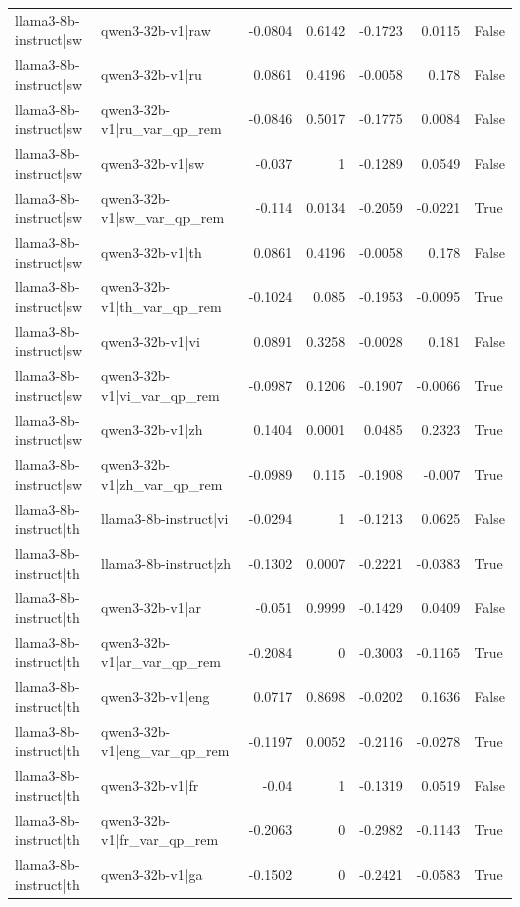 \begin{table}
\begin{tabular}{l l r r r r l}
llama3-8b-instruct|sw & qwen3-32b-v1|raw & -0.0804 & 0.6142 & -0.1723 & 0.0115 & False \\
llama3-8b-instruct|sw & qwen3-32b-v1|ru & 0.0861 & 0.4196 & -0.0058 & 0.178 & False \\
llama3-8b-instruct|sw & qwen3-32b-v1|ru_var_qp_rem & -0.0846 & 0.5017 & -0.1775 & 0.0084 & False \\
llama3-8b-instruct|sw & qwen3-32b-v1|sw & -0.037 & 1 & -0.1289 & 0.0549 & False \\
llama3-8b-instruct|sw & qwen3-32b-v1|sw_var_qp_rem & -0.114 & 0.0134 & -0.2059 & -0.0221 & True \\
llama3-8b-instruct|sw & qwen3-32b-v1|th & 0.0861 & 0.4196 & -0.0058 & 0.178 & False \\
llama3-8b-instruct|sw & qwen3-32b-v1|th_var_qp_rem & -0.1024 & 0.085 & -0.1953 & -0.0095 & True \\
llama3-8b-instruct|sw & qwen3-32b-v1|vi & 0.0891 & 0.3258 & -0.0028 & 0.181 & False \\
llama3-8b-instruct|sw & qwen3-32b-v1|vi_var_qp_rem & -0.0987 & 0.1206 & -0.1907 & -0.0066 & True \\
llama3-8b-instruct|sw & qwen3-32b-v1|zh & 0.1404 & 0.0001 & 0.0485 & 0.2323 & True \\
llama3-8b-instruct|sw & qwen3-32b-v1|zh_var_qp_rem & -0.0989 & 0.115 & -0.1908 & -0.007 & True \\
llama3-8b-instruct|th & llama3-8b-instruct|vi & -0.0294 & 1 & -0.1213 & 0.0625 & False \\
llama3-8b-instruct|th & llama3-8b-instruct|zh & -0.1302 & 0.0007 & -0.2221 & -0.0383 & True \\
llama3-8b-instruct|th & qwen3-32b-v1|ar & -0.051 & 0.9999 & -0.1429 & 0.0409 & False \\
llama3-8b-instruct|th & qwen3-32b-v1|ar_var_qp_rem & -0.2084 & 0 & -0.3003 & -0.1165 & True \\
llama3-8b-instruct|th & qwen3-32b-v1|eng & 0.0717 & 0.8698 & -0.0202 & 0.1636 & False \\
llama3-8b-instruct|th & qwen3-32b-v1|eng_var_qp_rem & -0.1197 & 0.0052 & -0.2116 & -0.0278 & True \\
llama3-8b-instruct|th & qwen3-32b-v1|fr & -0.04 & 1 & -0.1319 & 0.0519 & False \\
llama3-8b-instruct|th & qwen3-32b-v1|fr_var_qp_rem & -0.2063 & 0 & -0.2982 & -0.1143 & True \\
llama3-8b-instruct|th & qwen3-32b-v1|ga & -0.1502 & 0 & -0.2421 & -0.0583 & True \\

\end{tabular}
\end{table}
